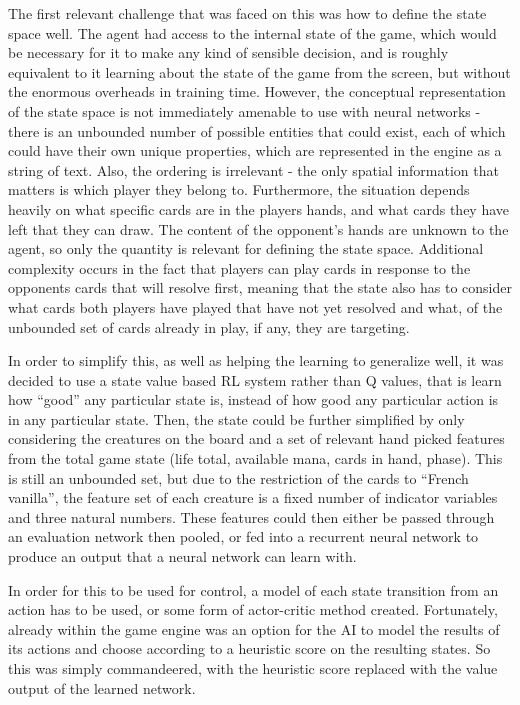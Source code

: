 The first relevant challenge that was faced on  this was how to define the state space well. The agent had access to the internal state of the game, which would be necessary for it to make any kind of sensible decision, and is roughly equivalent to it learning about the state of the game from the screen, but without the enormous overheads in training time. However, the conceptual representation of the state space is not immediately amenable to use with neural networks - there is an unbounded number of possible entities that could exist, each of which could have their own unique properties, which are represented in the engine as a string of text. Also, the ordering is irrelevant - the only spatial information that matters is which player they belong to. Furthermore, the situation depends heavily on what specific cards are in the players hands, and what cards they have left that they can draw. The content of the opponent's hands are unknown to the agent, so only the quantity is relevant for defining the state space. Additional complexity occurs in the fact that players can play cards in response to the opponents cards that will resolve first, meaning that the state also has to consider what cards both players have played that have not yet resolved and what, of the unbounded set of cards already in play, if any, they are targeting.

In order to simplify this, as well as helping the learning to generalize well, it was decided to use a state value based RL system rather than Q values, that is learn how ``good'' any particular state is, instead of how good any particular action is in any particular state. Then, the state could be further simplified by only considering the creatures on the board and a set of relevant hand picked features from the total game state (life total, available mana, cards in hand, phase). This is still an unbounded set, but due to the restriction of the cards to ``French vanilla'', the feature set of each creature is a fixed number of indicator variables and three natural numbers. These features could then either be passed through an evaluation network then pooled, or fed into a recurrent neural network to produce an output that a neural network can learn with. 

 In order for this to be used for control, a model of each state transition from an action has to be used, or some form of actor-critic method created. Fortunately, already within the game engine was an option for the AI to model the results of its actions and choose according to a heuristic score on the resulting states. So this was simply commandeered, with the heuristic score replaced with the value output of the learned network.
 
